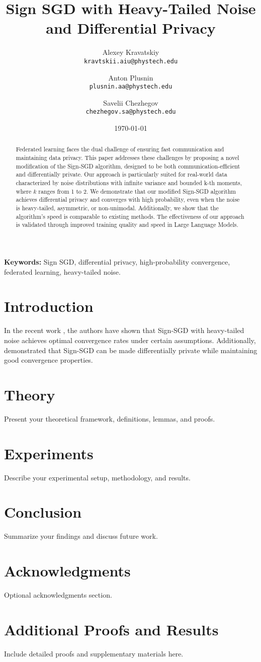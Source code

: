 \documentclass{article}
\title{Sign SGD with Heavy-Tailed Noise and Differential Privacy}
\author{
  Alexey Kravatskiy\\
  \texttt{kravtskii.aiu@phystech.edu}
  \and
  Anton Plusnin\\
  \texttt{plusnin.aa@phystech.edu}
  \and
  Savelii Chezhegov\\
  \texttt{chezhegov.sa@phystech.edu}
}
\date{\today}
\begin{document}
\maketitle

\begin{abstract}
Federated learning faces the dual challenge of ensuring fast communication and maintaining data privacy. This paper addresses these challenges by proposing a novel modification of the Sign-SGD algorithm, designed to be both communication-efficient and differentially private. Our approach is particularly suited for real-world data characterized by noise distributions with infinite variance and bounded k-th moments, where \( k \) ranges from 1 to 2. We demonstrate that our modified Sign-SGD algorithm achieves differential privacy and converges with high probability, even when the noise is heavy-tailed, asymmetric, or non-unimodal. Additionally, we show that the algorithm's speed is comparable to existing methods. The effectiveness of our approach is validated through improved training quality and speed in Large Language Models.
\end{abstract}

\noindent \textbf{Keywords:} Sign SGD, differential privacy, high-probability convergence, federated learning, heavy-tailed noise.

\section{Introduction}
In the recent work \parencite{Kornilov2025}, the authors have shown that Sign-SGD with heavy-tailed noise achieves optimal convergence rates under certain assumptions. Additionally, \parencite{Jin2020} demonstrated that Sign-SGD can be made differentially private while maintaining good convergence properties.

\section{Theory}
Present your theoretical framework, definitions, lemmas, and proofs.

\section{Experiments}
Describe your experimental setup, methodology, and results.

\section{Conclusion}
Summarize your findings and discuss future work.

\section*{Acknowledgments}
Optional acknowledgments section.

\appendix
\section{Additional Proofs and Results}
Include detailed proofs and supplementary materials here.

\printbibliography
\end{document}
